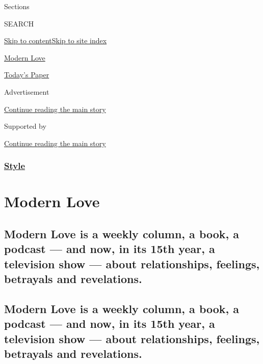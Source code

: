 Sections

SEARCH

\protect\hyperlink{site-content}{Skip to
content}\protect\hyperlink{site-index}{Skip to site index}

\href{https://www.nytimes.com/column/modern-love}{Modern Love}

\href{https://myaccount.nytimes.com/auth/login?response_type=cookie\&client_id=vi}{}

\href{https://www.nytimes.com/section/todayspaper}{Today's Paper}

Advertisement

\protect\hyperlink{after-top}{Continue reading the main story}

Supported by

\protect\hyperlink{after-sponsor}{Continue reading the main story}

\hypertarget{style}{%
\subsubsection{\texorpdfstring{\href{/section/style}{Style}}{Style}}\label{style}}

\hypertarget{modern-love}{%
\section{Modern Love}\label{modern-love}}

\hypertarget{modern-love-is-a-weekly-column-a-book-a-podcast--and-now-in-its-15th-year-a-television-show--about-relationships-feelings-betrayals-and-revelations}{%
\subsection{Modern Love is a weekly column, a book, a podcast --- and
now, in its 15th year, a television show --- about relationships,
feelings, betrayals and
revelations.}\label{modern-love-is-a-weekly-column-a-book-a-podcast--and-now-in-its-15th-year-a-television-show--about-relationships-feelings-betrayals-and-revelations}}

\hypertarget{modern-love-is-a-weekly-column-a-book-a-podcast--and-now-in-its-15th-year-a-television-show--about-relationships-feelings-betrayals-and-revelations-1}{%
\subsection{Modern Love is a weekly column, a book, a podcast --- and
now, in its 15th year, a television show --- about relationships,
feelings, betrayals and
revelations.}\label{modern-love-is-a-weekly-column-a-book-a-podcast--and-now-in-its-15th-year-a-television-show--about-relationships-feelings-betrayals-and-revelations-1}}

